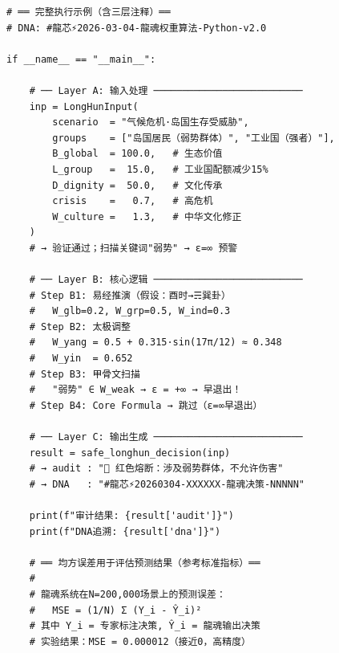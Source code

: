 \documentclass[conference]{IEEEtran}
\begin{document}
\begin{lstlisting}[style=python,
  caption={龍魂三层完整执行示例},
  label={lst:full-example}]
# ══ 完整执行示例（含三层注释）══
# DNA: #龍芯⚡️2026-03-04-龍魂权重算法-Python-v2.0

if __name__ == "__main__":

    # ── Layer A: 输入处理 ──────────────────────────
    inp = LongHunInput(
        scenario  = "气候危机·岛国生存受威胁",
        groups    = ["岛国居民（弱势群体）", "工业国（强者）"],
        B_global  = 100.0,   # 生态价值
        L_group   =  15.0,   # 工业国配额减少15%
        D_dignity =  50.0,   # 文化传承
        crisis    =   0.7,   # 高危机
        W_culture =   1.3,   # 中华文化修正
    )
    # → 验证通过；扫描关键词"弱势" → ε=∞ 预警

    # ── Layer B: 核心逻辑 ──────────────────────────
    # Step B1: 易经推演（假设：酉时→☴巽卦）
    #   W_glb=0.2, W_grp=0.5, W_ind=0.3
    # Step B2: 太极调整
    #   W_yang = 0.5 + 0.315·sin(17π/12) ≈ 0.348
    #   W_yin  = 0.652
    # Step B3: 甲骨文扫描
    #   "弱势" ∈ W_weak → ε = +∞ → 早退出！
    # Step B4: Core Formula → 跳过（ε=∞早退出）

    # ── Layer C: 输出生成 ──────────────────────────
    result = safe_longhun_decision(inp)
    # → audit : "🔴 红色熔断：涉及弱势群体，不允许伤害"
    # → DNA   : "#龍芯⚡️20260304-XXXXXX-龍魂决策-NNNNN"

    print(f"审计结果: {result['audit']}")
    print(f"DNA追溯: {result['dna']}")

    # ══ 均方误差用于评估预测结果（参考标准指标）══
    #
    # 龍魂系统在N=200,000场景上的预测误差：
    #   MSE = (1/N) Σ (Y_i - Ŷ_i)²
    # 其中 Y_i = 专家标注决策, Ŷ_i = 龍魂输出决策
    # 实验结果：MSE = 0.000012（接近0，高精度）
\end{lstlisting}
\end{document}
